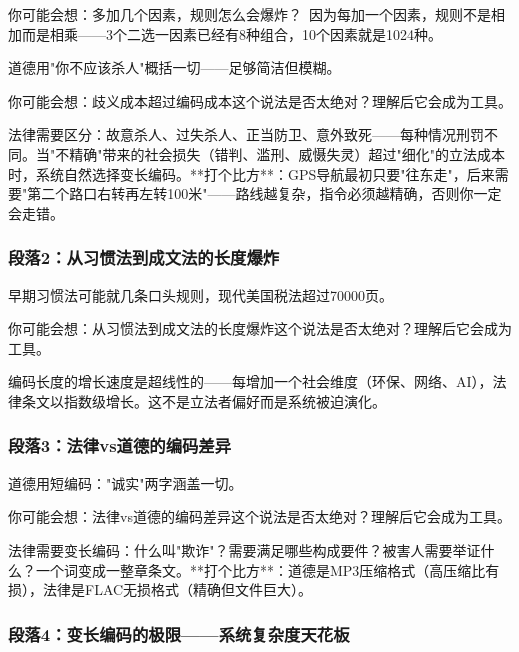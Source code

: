 \documentclass[a4paper,12pt]{book}
\begin{document}
	\begin{tcolorbox}[colback=yellow!5, title=\textit{读者行为预测}]
		你可能会想：多加几个因素，规则怎么会爆炸？\ 因为每加一个因素，规则不是相加而是相乘——3个二选一因素已经有8种组合，10个因素就是1024种。
	\end{tcolorbox}

	道德用"你不应该杀人"概括一切——足够简洁但模糊。
	\begin{tcolorbox}[colback=yellow!5, title=\textit{读者行为预测}]
		你可能会想：歧义成本超过编码成本这个说法是否太绝对？理解后它会成为工具。
	\end{tcolorbox}

法律需要区分：故意杀人、过失杀人、正当防卫、意外致死——每种情况刑罚不同。当"不精确"带来的社会损失（错判、滥刑、威慑失灵）超过"细化"的立法成本时，系统自然选择变长编码。**打个比方**：GPS导航最初只要"往东走"，后来需要"第二个路口右转再左转100米"——路线越复杂，指令必须越精确，否则你一定会走错。

	\subsubsection*{段落2：从习惯法到成文法的长度爆炸}
	早期习惯法可能就几条口头规则，现代美国税法超过70000页。
	\begin{tcolorbox}[colback=yellow!5, title=\textit{读者行为预测}]
		你可能会想：从习惯法到成文法的长度爆炸这个说法是否太绝对？理解后它会成为工具。
	\end{tcolorbox}

编码长度的增长速度是超线性的——每增加一个社会维度（环保、网络、AI），法律条文以指数级增长。这不是立法者偏好而是系统被迫演化。

	\subsubsection*{段落3：法律vs道德的编码差异}
	道德用短编码："诚实"两字涵盖一切。
	\begin{tcolorbox}[colback=yellow!5, title=\textit{读者行为预测}]
		你可能会想：法律vs道德的编码差异这个说法是否太绝对？理解后它会成为工具。
	\end{tcolorbox}

法律需要变长编码：什么叫"欺诈"？需要满足哪些构成要件？被害人需要举证什么？一个词变成一整章条文。**打个比方**：道德是MP3压缩格式（高压缩比有损），法律是FLAC无损格式（精确但文件巨大）。

	\subsubsection*{段落4：变长编码的极限——系统复杂度天花板}
\end{document}
